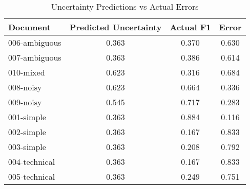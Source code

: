 \begin{table}[h]
\centering
\caption{Uncertainty Predictions vs Actual Errors}
\label{tab:uncertainty-validation}
\begin{tabular}{lccc}
\toprule
\textbf{Document} & \textbf{Predicted Uncertainty} & \textbf{Actual F1} & \textbf{Error} \\
\midrule
006-ambiguous & 0.363 & 0.370 & 0.630 \\
007-ambiguous & 0.363 & 0.386 & 0.614 \\
010-mixed & 0.623 & 0.316 & 0.684 \\
008-noisy & 0.623 & 0.664 & 0.336 \\
009-noisy & 0.545 & 0.717 & 0.283 \\
001-simple & 0.363 & 0.884 & 0.116 \\
002-simple & 0.363 & 0.167 & 0.833 \\
003-simple & 0.363 & 0.208 & 0.792 \\
004-technical & 0.363 & 0.167 & 0.833 \\
005-technical & 0.363 & 0.249 & 0.751 \\
\bottomrule
\end{tabular}
\end{table}